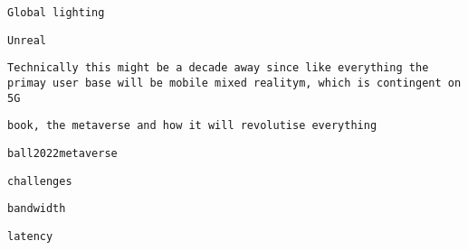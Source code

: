          
         
          \protect\hypertarget{ID_1422945071}{}{}

\begin{verbatim}
Global lighting
\end{verbatim}
         
       

       
       
        \protect\hypertarget{ID_721713037}{}{}

\begin{verbatim}
Unreal
\end{verbatim}
       

       
       
        \protect\hypertarget{ID_1877390377}{}{}

\begin{verbatim}
Technically this might be a decade away since like everything the primay user base will be mobile mixed realitym, which is contingent on 5G
\end{verbatim}

         
         
          \protect\hypertarget{ID_1294664741}{}{}

\begin{verbatim}
book, the metaverse and how it will revolutise everything
\end{verbatim}
         

         
         
          \protect\hypertarget{ID_1038385450}{}{}

\begin{verbatim}
ball2022metaverse
\end{verbatim}
         

         
         
          \protect\hypertarget{ID_498619502}{}{}

\begin{verbatim}
challenges
\end{verbatim}

           
           
            \protect\hypertarget{ID_827938896}{}{}

\begin{verbatim}
bandwidth
\end{verbatim}
           

           
           
            \protect\hypertarget{ID_1313445724}{}{}

\begin{verbatim}
latency
\end{verbatim}
           

